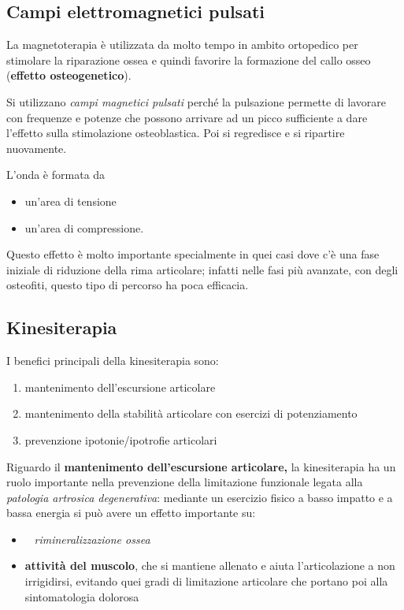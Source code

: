 \subsection{Campi elettromagnetici pulsati}

La magnetoterapia è utilizzata da molto tempo in ambito ortopedico per
stimolare la riparazione ossea e quindi favorire la formazione del callo
osseo (\textbf{effetto osteogenetico}).

Si utilizzano \emph{campi magnetici pulsati} perché la pulsazione
permette di lavorare con frequenze e potenze che possono arrivare ad un
picco sufficiente a dare l'effetto sulla stimolazione osteoblastica. Poi
si regredisce e si ripartire nuovamente.

L'onda è formata da

\begin{itemize}
\item
  un'area di tensione
\item
  un'area di compressione.
\end{itemize}


Questo effetto è molto importante specialmente in quei casi dove c'è una
fase iniziale di riduzione della rima articolare; infatti nelle fasi più
avanzate, con degli osteofiti, questo tipo di percorso ha poca
efficacia.


\subsection{Kinesiterapia}

I benefici principali della kinesiterapia sono:

\begin{enumerate}
\def\labelenumi{\arabic{enumi}.}
\item
  mantenimento dell'escursione articolare
\item
  mantenimento della stabilità articolare con esercizi di potenziamento
\item
  prevenzione ipotonie/ipotrofie articolari
\end{enumerate}

Riguardo il \textbf{mantenimento dell'escursione articolare,} la
kinesiterapia ha un ruolo importante nella prevenzione della limitazione
funzionale legata alla \emph{patologia artrosica degenerativa}: mediante
un esercizio fisico a basso impatto e a bassa energia si può avere un
effetto importante su:

\begin{itemize}
\item ~
 \textit{rimineralizzazione
  ossea}
\item
  \textbf{attività del muscolo}, che si mantiene allenato e aiuta
  l'articolazione a non irrigidirsi, evitando quei gradi di limitazione
  articolare che portano poi alla sintomatologia dolorosa
\end{itemize}

